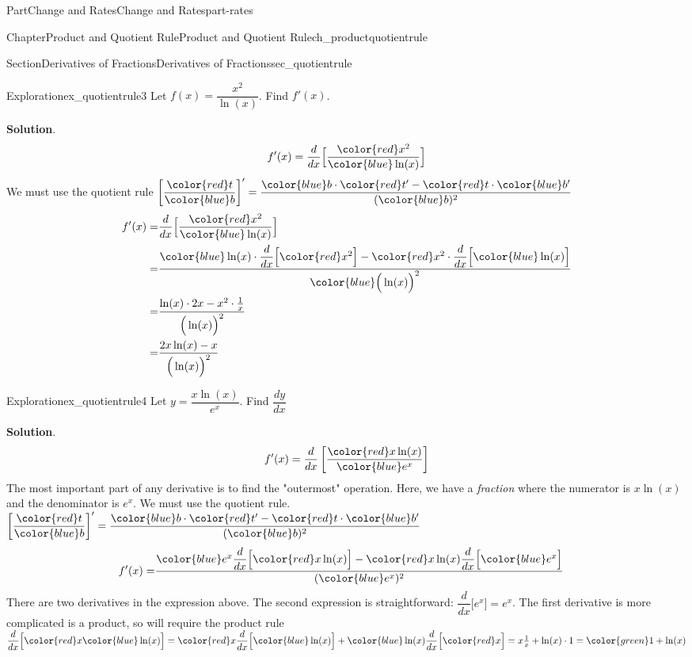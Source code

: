\documentclass{tufte-book}
\newcommand{\blocktitlefont}{\relax}
\numberwithin{equation}{chapter}
\newcommand{\red}[1]{   {\color{red}   #1}   }
\newcommand{\blue}[1]{  {\color{blue}  #1}  }
\newcommand{\green}[1]{ {\color{green} #1} }
\newcommand{\ddx}[1]{ \dfrac{d}{dx} \Big[ #1 \Big]  }
\newcommand{\ddxfrac}[1]{ \dfrac{d}{dx} \left[ #1 \right]  }
\newcommand{\amp}{&}
\begin{document}
\begin{partptx}{Part}{Change and Rates}{}{Change and Rates}{}{}{part-rates}
\begin{chapterptx}{Chapter}{Product and Quotient Rule}{}{Product and Quotient Rule}{}{}{ch_productquotientrule}
\begin{sectionptx}{Section}{Derivatives of Fractions}{}{Derivatives of Fractions}{}{}{sec_quotientrule}
\begin{exploration}{Exploration}{}{ex_quotientrule3}%
Let \(f(x) = \dfrac{x^2}{\ln(x)}\). Find \(f'(x)\).%
\par\smallskip%
\noindent\textbf{\blocktitlefont Solution}.\hypertarget{ex_quotientrule3-2}{}\quad{}%
\begin{equation*}
f'(x) = \ddx{ \dfrac{ \red{x^2} }{ \blue{\ln(x)}  } }
\end{equation*}
We must use the quotient rule \(\left[\dfrac{\red{t}}{\blue{b}}\right]' = \dfrac{\blue{b}\cdot \red{t'} - \red{t}\cdot \blue{b'}}{(\blue{b})^2}\)%
\begin{align*}
f'(x) =  \amp \ddx{ \dfrac{ \red{x^2} }{ \blue{\ln(x)}  } } \\
= \amp  \dfrac{ \blue{\ln(x)}\cdot \ddx{\red{x^2}} - \red{x^2}\cdot \ddx{\blue{\ln(x)}} }{ \blue{\Big(\ln(x)\Big)^2}  } \\
= \amp \dfrac{ \ln(x) \cdot 2x - x^2\cdot \frac{1}{x} }{ \Big(\ln(x)\Big)^2 }\\
= \amp \dfrac{ 2x\ln(x)- x }{ \Big(\ln(x)\Big)^2 }
\end{align*}
%
\end{exploration}%
\begin{exploration}{Exploration}{}{ex_quotientrule4}%
Let \(y= \dfrac{x\ln(x)}{e^x}\). Find \(\dfrac{dy}{dx}\)%
\par\smallskip%
\noindent\textbf{\blocktitlefont Solution}.\hypertarget{ex_quotientrule4-2}{}\quad{}%
\begin{equation*}
f'(x) = \ddxfrac{ \dfrac{ \red{ x\ln(x)} }{ \blue{e^x} } }
\end{equation*}
The most important part of any derivative is to find the "outermost" operation. Here, we have a \emph{fraction} where the numerator is \(x\ln(x)\) and the denominator is \(e^x\). We must use the quotient rule. \(\left[\dfrac{\red{t}}{\blue{b}}\right]' = \dfrac{\blue{b}\cdot \red{t'} - \red{t}\cdot \blue{b'}}{(\blue{b})^2}\)%
\begin{align*}
f'(x) = \amp \dfrac{\blue{e^x} \ddx{\red{x\ln(x)}} - \red{x\ln(x)}\ddx{\blue{e^x}}}{(\blue{e^x})^2}
\end{align*}
There are two derivatives in the expression above.  The second expression is straightforward: \(\ddx{e^x}=e^x\).  The first derivative is more complicated is a product, so will require the product rule \(\ddx{\red{x} \blue{\ln(x)}} = \red{x}\ddx{\blue{\ln(x)}} + \blue{\ln(x)}\ddx{\red{x}} = x\frac{1}{x} + \ln(x)\cdot 1 = \green{1 + \ln(x)}\)%
\begin{align*}

\end{align*}
\end{exploration}
\end{sectionptx}
\end{chapterptx}
\end{partptx}
\end{document}
